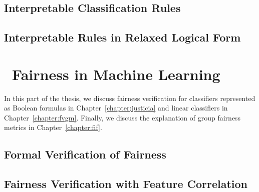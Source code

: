 \chapter{Interpretable Classification Rules}










\chapter{Interpretable Rules in Relaxed Logical Form}








\part{~Fairness in Machine Learning}

In this part of the thesis, we discuss fairness verification for classifiers represented as Boolean formulas in Chapter~\ref{chapter:justicia} and linear classifiers in Chapter~\ref{chapter:fvgm}. Finally, we discuss the explanation of group fairness metrics in Chapter~\ref{chapter:fif}.

\chapter{Formal Verification of Fairness}






\chapter{Fairness Verification with Feature Correlation}






				
